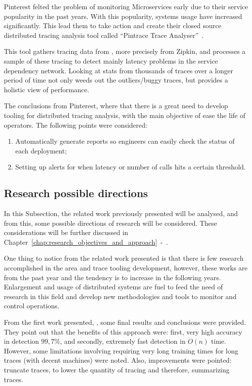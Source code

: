 Pinterest felted the problem of monitoring Microservices early due to their service popularity in the past years. With this popularity, systems usage have increased significantly. This lead them to take action and create their closed source distributed tracing analysis tool called ``Pintrace Trace Analyser''~\cite{analysing_distributed_trace_data}.

This tool gathers tracing data from , more precisely from Zipkin, and processes a sample of these tracing to detect mainly latency problems in the service dependency network. Looking at stats from thousands of traces over a longer period of time not only weeds out the outliers/buggy traces, but provides a holistic view of performance.

The conclusions from Pinterest, where that there is a great need to develop tooling for distributed tracing analysis, with the main objective of ease the life of operators. The following points were considered:

\begin{enumerate}
    \item Automatically generate reports so engineers can easily check the status of each deployment;
    \item Setting up alerts for when latency or number of calls hits a certain threshold.
\end{enumerate}

\subsection{Research possible directions}
\label{subsec:research_possible_directions}

In this Subsection, the related work previously presented will be analysed, and from this, some possible directions of research will be considered. These considerations will be further discussed in Chapter~\ref{chap:research_objectives_and_approach}~-~.

One thing to notice from the related work presented is that there is few research accomplished in the area and trace tooling development, however, these works are from the past year and the tendency is to increase in the following years. Enlargement and usage of distributed systems are fuel to feed the need of research in this field and develop new methodologies and tools to monitor and control operations.

From the first work presented, , some final results and conclusions were provided. They point out that the benefits of this approach were: first, very high accuracy in detection $99,7\%$, and secondly, extremely fast detection in $O(n)$ time. However, some limitations involving requiring very long training times for long traces (with decent machines) were noted. Also, improvements were pointed: truncate traces, to lower the quantity of tracing and therefore, summarizing traces.

